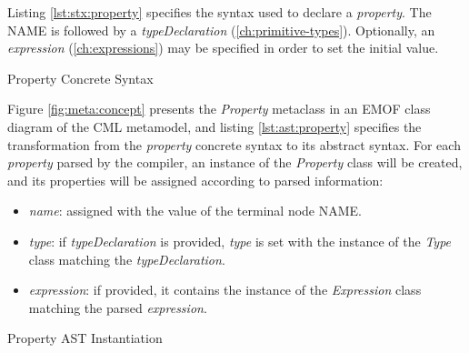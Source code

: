 Listing \ref{lst:stx:property} specifies the syntax used
to declare a \emph{property}.
The NAME is followed by a \emph{typeDeclaration}
(\ref{ch:primitive-types}).
Optionally, an \emph{expression} (\ref{ch:expressions}) may be specified
in order to set the initial value.

\begin{code}
\verbatimfont{\small}

\caption{Property Concrete Syntax}
\label{lst:stx:property}
\end{code}

Figure \ref{fig:meta:concept} presents the \emph{Property} metaclass
in an EMOF \cite{mof} class diagram of the CML metamodel,
and listing \ref{lst:ast:property} specifies
the transformation
from the \emph{property} concrete syntax to its abstract syntax.
For each \emph{property} parsed by the compiler,
an instance of the \emph{Property} class will be created,
and its properties will be assigned
according to parsed information:

\begin{itemize}

\item \emph{name}:
assigned with the value of the terminal node NAME.

\item \emph{type}:
if \emph{typeDeclaration} is provided,
\emph{type} is set with the instance of the \emph{Type} class
matching the \emph{typeDeclaration}.

\item \emph{expression}:
if provided,
it contains the instance of the \emph{Expression} class
matching the parsed \emph{expression}.

\end{itemize}

\begin{code}
\verbatimfont{\small}

\caption{Property AST Instantiation}
\label{lst:ast:property}
\end{code}
